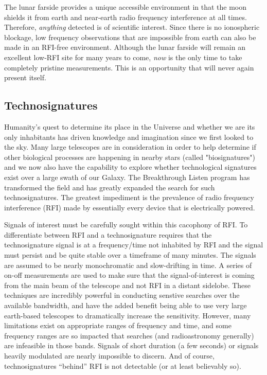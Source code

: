 The lunar farside provides a unique accessible environment in that the moon shields it from earth and near-earth radio frequency interference at all times.  Therefore, {\em anything} detected is of scientific interest. Since there is no ionospheric blockage, low frequency observations that are impossible from earth can also be made in an RFI-free environment.  Although the lunar farside will remain an excellent low-RFI site for many years to come, {\em now} is the only time to take completely pristine measurements.  This is an opportunity that will never again present itself.

\subsection{Technosignatures}
Humanity's quest to determine its place in the Universe and whether we are its only inhabitants has driven knowledge and imagination since we first looked to the sky.  Many large telescopes are in consideration in order to help determine if other biological processes are happening in nearby stars (called "biosignatures") and we now also have the capability to explore whether technological signatures exist over a large swath of our Galaxy.  The Breakthrough Listen program has transformed the field and has greatly expanded the search for such technosignatures.  The greatest impediment is the prevalence of radio frequency interference (RFI) made by essentially every device that is electrically powered.

Signals of interest must be carefully sought within this cacophony of RFI.  To differentiate between RFI and a technosignature requires that the technosignature signal is at a frequency/time not inhabited by RFI and the signal must persist and be quite stable over a timeframe of many minutes.  The signals are assumed to be nearly monochromatic and slow-drifting in time.  A series of on-off measurements are used to make sure that the signal-of-interest is coming from the main beam of the telescope and not RFI in a distant sidelobe.  These techniques are incredibly powerful in conducting senstive searches over the available bandwidth, and have the added benefit being able to use very large earth-based telescopes to dramatically increase the sensitivity.  However, many limitations exist on appropriate ranges of frequency and time, and some frequency ranges are so impacted that searches (and radioastronomy generally) are infeasible in those bands.  Signals of short duration (a few seconds) or signals heavily modulated are nearly impossible to discern.  And of course, technosignatures ``behind'' RFI is not detectable (or at least believably so).

